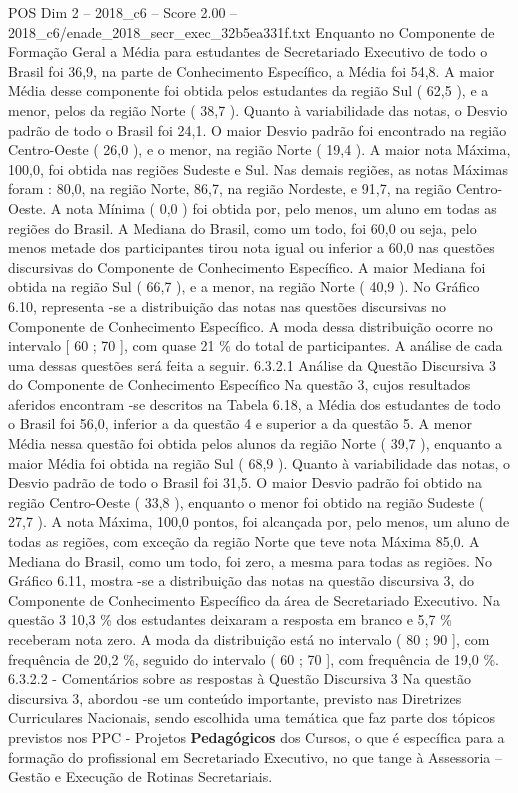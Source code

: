 \begin{textsample}{POS Dim 2 – 2018\_c6 – Score 2.00 – 2018\_c6/enade\_2018\_secr\_exec\_32b5ea331f.txt}
Enquanto no Componente de Formação Geral a Média para estudantes de Secretariado Executivo de todo o Brasil foi 36,9, na parte de Conhecimento Específico, a Média foi 54,8.
A maior Média desse componente foi obtida pelos estudantes da região Sul ( 62,5 ), e a menor, pelos da região Norte ( 38,7 ).
Quanto à variabilidade das notas, o Desvio padrão de todo o Brasil foi 24,1.
O maior Desvio padrão foi encontrado na região Centro-Oeste ( 26,0 ), e o menor, na região Norte ( 19,4 ).
A maior nota Máxima, 100,0, foi obtida nas regiões Sudeste e Sul.
Nas demais regiões, as notas Máximas foram : 80,0, na região Norte, 86,7, na região Nordeste, e 91,7, na região Centro-Oeste.
A nota Mínima ( 0,0 ) foi obtida por, pelo menos, um aluno em todas as regiões do Brasil.
A Mediana do Brasil, como um todo, foi 60,0 ou seja, pelo menos metade dos participantes tirou nota igual ou inferior a 60,0 nas questões discursivas do Componente de Conhecimento Específico.
A maior Mediana foi obtida na região Sul ( 66,7 ), e a menor, na região Norte ( 40,9 ).
No Gráfico 6.10, representa -se a distribuição das notas nas questões discursivas no Componente de Conhecimento Específico.
A moda dessa distribuição ocorre no intervalo [ 60 ; 70 ], com quase 21 \% do total de participantes.
A análise de cada uma dessas questões será feita a seguir. 6.3.2.1 Análise da Questão Discursiva 3 do Componente de Conhecimento Específico Na questão 3, cujos resultados aferidos encontram -se descritos na Tabela 6.18, a Média dos estudantes de todo o Brasil foi 56,0, inferior a da questão 4 e superior a da questão 5.
A menor Média nessa questão foi obtida pelos alunos da região Norte ( 39,7 ), enquanto a maior Média foi obtida na região Sul ( 68,9 ).
Quanto à variabilidade das notas, o Desvio padrão de todo o Brasil foi 31,5.
O maior Desvio padrão foi obtido na região Centro-Oeste ( 33,8 ), enquanto o menor foi obtido na região Sudeste ( 27,7 ).
A nota Máxima, 100,0 pontos, foi alcançada por, pelo menos, um aluno de todas as regiões, com exceção da região Norte que teve nota Máxima 85,0.
A Mediana do Brasil, como um todo, foi zero, a mesma para todas as regiões.
No Gráfico 6.11, mostra -se a distribuição das notas na questão discursiva 3, do Componente de Conhecimento Específico da área de Secretariado Executivo.
Na questão 3 10,3 \% dos estudantes deixaram a resposta em branco e 5,7 \% receberam nota zero.
A moda da distribuição está no intervalo ( 80 ; 90 ], com frequência de 20,2 \%, seguido do intervalo ( 60 ; 70 ], com frequência de 19,0 \%. 6.3.2.2 - Comentários sobre as respostas à Questão Discursiva 3 Na questão discursiva 3, abordou -se um conteúdo importante, previsto nas Diretrizes Curriculares Nacionais, sendo escolhida uma temática que faz parte dos tópicos previstos nos PPC - Projetos \textbf{Pedagógicos} dos Cursos, o que é específica para a formação do profissional em Secretariado Executivo, no que tange à Assessoria – Gestão e Execução de Rotinas Secretariais.

\end{textsample}
